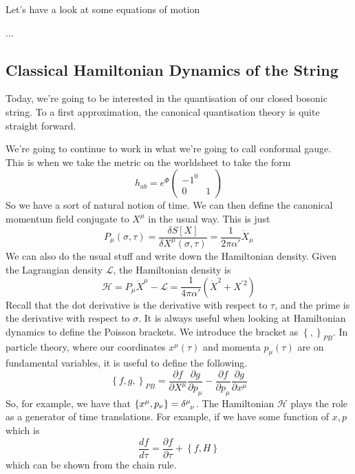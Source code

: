 \documentclass[11pt, oneside]{article}   	%
\theoremstyle{slanted}
\begin{document}
Let's have a look at 
some equations of motion 

...

\subsection{Classical Hamiltonian Dynamics of the String}
Today, we're 
going to be interested in the quantisation 
of our closed bosonic string. 
To a first approximation, 
the canonical quantisation theory is 
quite straight forward. 

We're going to continue to
work in what we're going to 
call conformal gauge. 
This is when we take the metric 
on the worldsheet to take 
the form 
\[
 h _{ ab }  = e ^{ \Phi } \begin{pmatrix}  
  - 1 ^ 0 \\ 0 & 1 \end{pmatrix} 
\] So we have a sort of natural notion of time. 
We can then define the 
canonical momentum field 
conjugate to $  X^ \mu $ 
in the usual way. 
This is just 
\[
 P _ \mu \left( \sigma, \tau  \right)   = \frac{\delta S \left[  X  \right]  }{ 
 \delta X ^ \mu \left( \sigma, \tau  \right)  }  = \frac{1}{2 \pi \alpha   ' }\dot{ X } _ \mu   
\] We can also do the usual stuff 
and write down the Hamiltonian density. 
Given the Lagrangian density 
$ \mathcal{ L } $, the Hamiltonian 
density is 
\[
 \mathcal{ H }  = P _ \mu \dot{ X } ^ \mu  - \mathcal{ L }  = \frac{1}{4 \pi \alpha  ' }
 \left( \dot{ X } ^ 2 + X ^{ ' 2 }   \right)  
\]  Recall that the 
dot derivative is the derivative 
with respect to $ \tau $, and the prime is the 
derivative with respect to $ \sigma $. 
It is always useful when looking at 
Hamiltonian dynamics 
to define the Poisson brackets. 
We introduce the bracket as $ \left\{  ,  \right\}  _{ P B } $. 
In particle theory, 
where our coordinates 
$ x ^ \mu \left( \tau  \right)  $ and 
momenta $ p _ \mu \left( \tau  \right)  $ are 
on fundamental variables, it is useful to define the following. 
\[
 \left\{  f, g,  \right\}  _{ P B }  = 
 \frac{\partial  f }{\partial  X ^ \mu }  \frac{\partial  g }{\partial  p_ \mu }  
  - \frac{\partial  f }{\partial  p _ \mu }  \frac{\partial  g }{\partial  x^ \mu } 
\]  So, for example, we have that 
$ \left\{ x ^ \mu , p _ \nu  \right\}   = \delta \indices{ ^ \mu _ \nu }  $. 
The Hamiltonian $ \mathcal{ H } $ plays the 
role as a generator 
of time translations. For example, if we 
have some function of $ x, p $ which is 
\[
 \frac{df }{ d \tau }  = \frac{\partial  f }{\partial \tau } + \left\{  f, H  \right\}   
\] which can be shown from the chain rule. 
\end{document}
